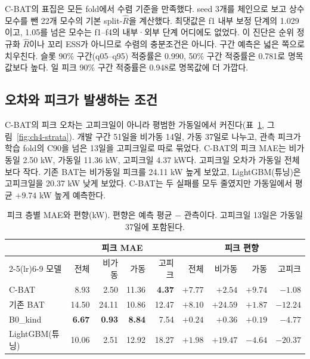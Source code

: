 C-BAT의 표집은 모든 fold에서 수렴 기준을 만족했다. seed 3개를 체인으로 보고 상수 모수를 뺀 22개 모수의 기본 split-$\hat R$\citep{gelman1992rhat}을 계산했다. 최댓값은 f1 내부 보정 단계의 1.029이고, 1.05를 넘은 모수는 f1--f4의 내부·외부 단계 어디에도 없었다. 이 진단은 순위 정규화 $\hat R$\citep{vehtari2021rhat}이나 꼬리 ESS가 아니므로 수렴의 충분조건은 아니다. 구간 예측은 넓은 쪽으로 치우친다. 슬롯 90\% 구간(q05--q95) 적중률은 0.990, 50\% 구간 적중률은 0.781로 명목값보다 높다. 일 피크 90\% 구간 적중률은 0.948로 명목값에 더 가깝다.

\subsection{오차와 피크가 발생하는 조건}

C-BAT의 피크 오차는 고피크일이 아니라 평범한 가동일에서 커진다(표~\ref{tab:ch4-strata}, 그림~\ref{fig:ch4-strata}). 개발 구간 51일을 비가동 14일, 가동 37일로 나누고, 관측 피크가 학습 fold의 C90을 넘은 13일을 고피크일로 따로 묶었다. C-BAT의 피크 MAE는 비가동일 2.50 kW, 가동일 11.36 kW, 고피크일 4.37 kW다. 고피크일 오차가 가동일 전체보다 작다. 기존 BAT는 비가동일 피크를 24.11 kW 높게 보았고, LightGBM(튜닝)은 고피크일을 20.37 kW 낮게 보았다. C-BAT는 두 실패를 모두 줄였지만 가동일에서 평균 $+9.74$ kW 높게 예측한다.

\begin{table}[htbp]
\centering
\caption{피크 층별 MAE와 편향(kW). 편향은 예측 평균 $-$ 관측이다. 고피크일 13일은 가동일 37일에 포함된다.}
\label{tab:ch4-strata}
\small
\begin{tabular}{lrrrrrrrr}
\toprule
 & \multicolumn{4}{c}{피크 MAE} & \multicolumn{4}{c}{피크 편향} \\
\cmidrule(lr){2-5}\cmidrule(lr){6-9}
모델 & 전체 & 비가동 & 가동 & 고피크 & 전체 & 비가동 & 가동 & 고피크 \\
\midrule
C-BAT & 8.93 & 2.50 & 11.36 & \textbf{4.37} & $+7.77$ & $+2.54$ & $+9.74$ & $-1.08$ \\
기존 BAT & 14.50 & 24.11 & 10.86 & 12.47 & $+8.10$ & $+24.59$ & $+1.87$ & $-12.24$ \\
B0\_kind & \textbf{6.67} & \textbf{0.93} & \textbf{8.84} & 7.54 & $+0.24$ & $+0.36$ & $+0.19$ & $-4.77$ \\
LightGBM(튜닝) & 10.06 & 2.51 & 12.92 & 18.27 & $+1.98$ & $+19.47$ & $-4.64$ & $-20.37$ \\
\bottomrule
\end{tabular}
\end{table}

